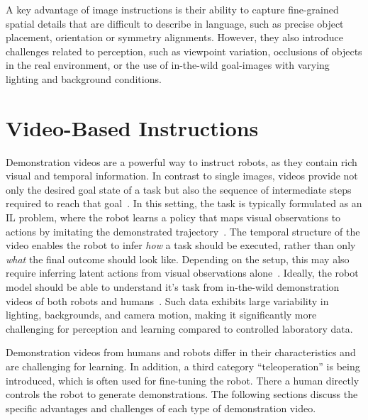 A key advantage of image instructions is their ability to capture fine-grained spatial details that are difficult to describe in language, such as precise object placement, orientation or symmetry alignments. However, they also introduce challenges related to perception, such as viewpoint variation, occlusions of objects in the real environment, or the use of in-the-wild goal-images with varying lighting and background conditions.




\section{Video-Based Instructions}

Demonstration videos are a powerful way to instruct robots, as they contain rich visual and temporal information. In contrast to single images, videos provide not only the desired goal state of a task but also the sequence of intermediate steps required to reach that goal~\cite{Jain2024Vid2RobotEV}.
In this setting, the task is typically formulated as an \ac{IL} problem, where the robot learns a policy that maps visual observations to actions by imitating the demonstrated trajectory~\cite{Jain2024Vid2RobotEV}. The temporal structure of the video enables the robot to infer \textit{how} a task should be executed, rather than only \textit{what} the final outcome should look like. Depending on the setup, this may also require inferring latent actions from visual observations alone~\cite{Jain2024Vid2RobotEV}.
Ideally, the robot model should be able to understand it's task from in-the-wild demonstration videos of both robots and humans~\cite{Chen2025VidBotLG}. Such data exhibits large variability in lighting, backgrounds, and camera motion, making it significantly more challenging for perception and learning compared to controlled laboratory data.

Demonstration videos from humans and robots differ in their characteristics and are challenging for learning. In addition, a third category ``teleoperation'' is being introduced, which is often used for fine-tuning the robot. There a human directly controls the robot to generate demonstrations.
The following sections discuss the specific advantages and challenges of each type of demonstration video.

